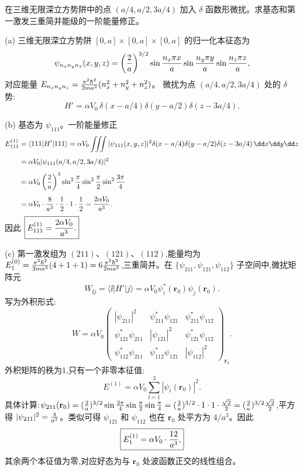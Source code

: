 \begin{question}
在三维无限深立方势阱中的点 $(a/4,a/2,3a/4)$ 加入 $\delta$ 函数形微扰。求基态和第一激发三重简并能级的一阶能量修正。
\begin{solution}
(a) 三维无限深立方势阱 $[0,a]\times[0,a]\times[0,a]$ 的归一化本征态为
\[
\psi_{n_xn_yn_z}(x,y,z)=\left({2\over a}\right)^{3/2}
\sin{n_x\pi x\over a}\sin{n_y\pi y\over a}\sin{n_z\pi z\over a},
\]
对应能量 $E_{n_xn_yn_z}={\pi^2\hbar^2\over2ma^2}(n_x^2+n_y^2+n_z^2)$。
微扰为点 $(a/4,a/2,3a/4)$ 处的 $\delta$ 势:
\[
H'=\alpha V_0\,\delta(x-a/4)\delta(y-a/2)\delta(z-3a/4).
\]

(b) 基态为 $\psi_{111}$。一阶能量修正
\[
\begin{aligned}
E_{111}^{(1)}&=\langle111|H'|111\rangle
=\alpha V_0\iiint|\psi_{111}(x,y,z)|^2
\delta(x-a/4)\delta(y-a/2)\delta(z-3a/4)\,\dd x\dd y\dd z \\[4pt]
&=\alpha V_0|\psi_{111}(a/4,a/2,3a/4)|^2 \\[4pt]
&=\alpha V_0\left({2\over a}\right)^{3}
\sin^2{\pi\over4}\sin^2{\pi\over2}\sin^2{3\pi\over4} \\[4pt]
&=\alpha V_0\cdot{8\over a^3}\cdot{1\over2}\cdot1\cdot{1\over2}
={2\alpha V_0\over a^3}.
\end{aligned}
\]
因此 $\boxed{E_{111}^{(1)}={2\alpha V_0\over a^3}.}$

(c) 第一激发组为 $(211)$、$(121)$、$(112)$,能量均为 $E_1^{(0)}={\pi^2\hbar^2\over2ma^2}(4+1+1)=6{\pi^2\hbar^2\over2ma^2}$,三重简并。在 $\{\psi_{211},\psi_{121},\psi_{112}\}$ 子空间中,微扰矩阵元
\[
W_{\ii j}=\langle \ii|H'|j\rangle
=\alpha V_0\psi_i^*(\mathbf r_0)\psi_j(\mathbf r_0).
\]
写为外积形式:
\[
W=\alpha V_0\begin{pmatrix}
|\psi_{211}|^2 & \psi_{211}^*\psi_{121} & \psi_{211}^*\psi_{112}\\[2pt]
\psi_{121}^*\psi_{211} & |\psi_{121}|^2 & \psi_{121}^*\psi_{112}\\[2pt]
\psi_{112}^*\psi_{211} & \psi_{112}^*\psi_{121} & |\psi_{112}|^2
\end{pmatrix}_{\mathbf r_0}.
\]
外积矩阵的秩为1,只有一个非零本征值:
\[
E^{(1)}=\alpha V_0\sum_{\ii=1}^3|\psi_i(\mathbf r_0)|^2.
\]
具体计算:$\psi_{211}(\mathbf r_0)=({2\over a})^{3/2}\sin{2\pi\over4}\sin{\pi\over2}\sin{\pi\over4}
=({2\over a})^{3/2}\cdot1\cdot1\cdot{\sqrt2\over2}=({2\over a})^{3/2}{\sqrt2\over2}$,平方得 $|\psi_{211}|^2={4\over a^3}$。类似可得 $\psi_{121}$ 和 $\psi_{112}$ 也在 $\mathbf r_0$ 处平方为 $4/a^3$。因此
\[
\boxed{E_1^{(1)}=\alpha V_0\cdot{12\over a^3},}
\]
其余两个本征值为零,对应好态为与 $\mathbf r_0$ 处波函数正交的线性组合。
\end{solution}
\end{question}

